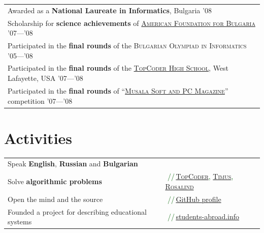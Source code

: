 \documentclass[a4paper,10pt]{article}
\newcommand{\comment}[1]{\small\textcolor{darkgreen}{\,\,//\,#1}}
\begin{document}
{\hspace{3mm}\begin{tabular}{@{•\enskip}p{14.5cm}}
	Awarded as a \textbf{National Laureate in Informatics}, Bulgaria \textsc{'08}\\
        Scholarship for \textbf{science achievements} of \href{http://www.afbulgaria.org/}{\textsc{American Foundation for Bulgaria}} \textsc{'07}---\textsc{'08}\\
	Participated in the \textbf{final rounds} of the \textsc{Bulgarian Olympiad in Informatics} \textsc{'05}---\textsc{'08}\\
        Participated in the \textbf{final rounds} of the \href{http://community.topcoder.com/tc?module=Static&d1=tournaments&d2=home}{\textsc{TopCoder High School}}, West Lafayette, USA \textsc{'07}---\textsc{'08}\\
        Participated in the \textbf{final rounds} of ``\href{http://konkurs.musala.com/}{\textsc{Musala Soft and PC Magazine}}'' competition \textsc{'07}---\textsc{'08}\\
\end{tabular}

\section{Activities}
\hspace{2mm}\begin{tabular}{@{•\enskip}ll}
        Speak \textbf{English}, \textbf{Russian} and \textbf{Bulgarian} &\\
        Solve \textbf{algorithmic problems} &
              \comment{\href{http://www.topcoder.com/tc?module=MemberProfile&cr=10205233}{\textsc{TopCoder}}, \href{http://acm.timus.ru/author.aspx?id=30642}{\textsc{Timus}}, \href{http://rosalind.info/users/cheater_no1/}{\textsc{Rosalind}} }\\
        Open the mind and the source &
              \comment{\href{https://github.com/petar-ivanov/}{GitHub profile} }\\
        Founded a project for describing educational systems &
              \comment{\href{http://students-abroad.info/}{students-abroad.info} }\\
        

\end{tabular}}
\end{document}
